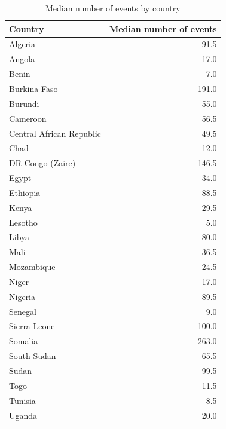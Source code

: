 \begin{table}

\caption{Median number of events by country}
\centering
\begin{tabular}[t]{lr}
\toprule
Country & Median number of events\\
\midrule
Algeria & 91.5\\
Angola & 17.0\\
Benin & 7.0\\
Burkina Faso & 191.0\\
Burundi & 55.0\\
\addlinespace
Cameroon & 56.5\\
Central African Republic & 49.5\\
Chad & 12.0\\
DR Congo (Zaire) & 146.5\\
Egypt & 34.0\\
\addlinespace
Ethiopia & 88.5\\
Kenya & 29.5\\
Lesotho & 5.0\\
Libya & 80.0\\
Mali & 36.5\\
\addlinespace
Mozambique & 24.5\\
Niger & 17.0\\
Nigeria & 89.5\\
Senegal & 9.0\\
Sierra Leone & 100.0\\
\addlinespace
Somalia & 263.0\\
South Sudan & 65.5\\
Sudan & 99.5\\
Togo & 11.5\\
Tunisia & 8.5\\
\addlinespace
Uganda & 20.0\\
\bottomrule
\end{tabular}
\end{table}

